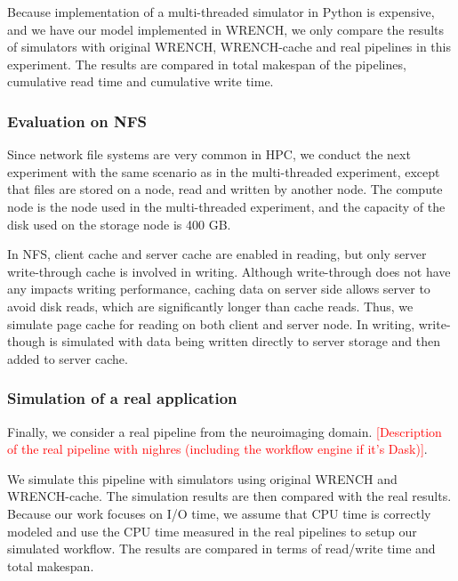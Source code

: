 \documentclass[conference]{IEEEtran}
\begin{document}
            Because implementation of a multi-threaded simulator in Python is 
            expensive, and we have our model implemented in WRENCH, 
            we only compare the results of simulators with original WRENCH, 
            WRENCH-cache and real pipelines in this experiment. 
            The results are compared in total makespan of the pipelines, 
            cumulative read time and cumulative write time.
            
            \subsubsection{Evaluation on NFS}
            
            Since network file systems are very common in HPC, we conduct 
            the next experiment with the same scenario as in the multi-threaded experiment, 
            except that files are stored on a node, read and written by another node. 
            The compute node is the node used in the multi-threaded experiment, 
            and the capacity of the disk used on the storage node is 400 GB.
            
            In NFS, client cache and server cache are enabled in reading, but only 
            server write-through cache is involved in writing. 
            Although write-through does not have any impacts writing performance, 
            caching data on server side allows server to avoid disk reads, which are 
            significantly longer than cache reads.
            Thus, we simulate page cache for reading on both client and server node.
            In writing, write-though is simulated with data being written directly to 
            server storage and then added to server cache. 
            
            \subsubsection{Simulation of a real application}

            Finally, we consider a real pipeline from the neuroimaging domain.             
            \textcolor{red}{[Description of the real pipeline with nighres 
            (including the workflow engine if it's Dask)]}.              
            
            We simulate this pipeline with simulators using original WRENCH and 
            WRENCH-cache. 
            The simulation results are then compared with the real results. 
            Because our work focuses on I/O time, we assume that CPU time is 
            correctly modeled and use the CPU time measured in the real pipelines 
            to setup our simulated workflow. The results are compared in terms of 
            read/write time and total makespan.
\end{document}
